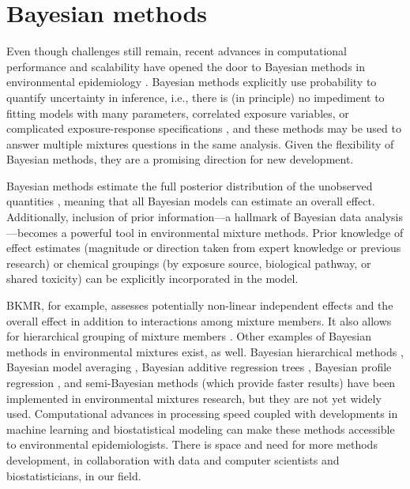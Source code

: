 \section{Bayesian methods}\label{sec:Bayes}
Even though challenges still remain, recent advances in computational performance and scalability have opened the door to Bayesian methods in environmental epidemiology \citep{hoffman2013stochastic}. Bayesian methods explicitly use probability to quantify uncertainty in inference, i.e., there is (in principle) no impediment to fitting models with many parameters, correlated exposure variables, or complicated exposure-response specifications \citep{bda3}, and these methods may be used to answer multiple mixtures questions in the same analysis. Given the flexibility of Bayesian methods, they are a promising direction for new development.

Bayesian methods estimate the full posterior distribution of the unobserved quantities \citep{bda3}, meaning that all Bayesian models can estimate an overall effect. Additionally, inclusion of prior information---a hallmark of Bayesian data analysis---becomes a powerful tool in environmental mixture methods. Prior knowledge of effect estimates (magnitude or direction taken from expert knowledge or previous research) or chemical groupings (by exposure source, biological pathway, or shared toxicity) can be explicitly incorporated in the model.

BKMR, for example, assesses potentially non-linear independent effects and the overall effect in addition to interactions among mixture members. It also allows for hierarchical grouping of mixture members \citep{bobb2014bayesian, coull2015, bobb2018statistical}. Other examples of Bayesian methods in environmental mixtures exist, as well. Bayesian hierarchical methods \citep{maclehose2007bayesian, maclehose2014applications, furlong2017prenatal}, Bayesian model averaging \citep{fragoso2018bayesian, wilson2018model, berger2018associations, berger2018prenatal, berger2018associations2}, Bayesian additive regression trees \citep{park2014environmental, chipman2010bart, ko2016classification}, Bayesian profile regression \citep{coker2018multi, coker2017association, molitor2010bayesian}, and semi-Bayesian methods (which provide faster results) \citep{mak13_org,kalkbrenner2010perinatal,momoli2010analysis} have been implemented in environmental mixtures research, but they are not yet widely used. Computational advances in processing speed coupled with developments in machine learning and biostatistical modeling can make these methods accessible to environmental epidemiologists. There is space and need for more methods development, in collaboration with data and computer scientists and biostatisticians, in our field.

